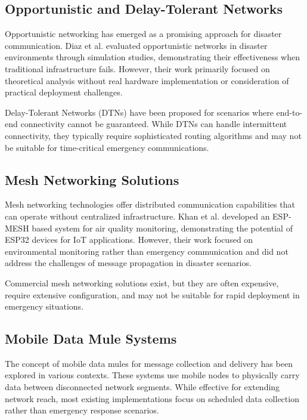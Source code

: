 \documentclass[conference]{IEEEtran}
\begin{document}
\subsection{Opportunistic and Delay-Tolerant Networks}

Opportunistic networking has emerged as a promising approach for disaster communication. Diaz et al. \cite{Diaz2012} evaluated opportunistic networks in disaster environments through simulation studies, demonstrating their effectiveness when traditional infrastructure fails. However, their work primarily focused on theoretical analysis without real hardware implementation or consideration of practical deployment challenges.

Delay-Tolerant Networks (DTNs) have been proposed for scenarios where end-to-end connectivity cannot be guaranteed. While DTNs can handle intermittent connectivity, they typically require sophisticated routing algorithms and may not be suitable for time-critical emergency communications.

\subsection{Mesh Networking Solutions}

Mesh networking technologies offer distributed communication capabilities that can operate without centralized infrastructure. Khan et al. \cite{Khan2022} developed an ESP-MESH based system for air quality monitoring, demonstrating the potential of ESP32 devices for IoT applications. However, their work focused on environmental monitoring rather than emergency communication and did not address the challenges of message propagation in disaster scenarios.

Commercial mesh networking solutions exist, but they are often expensive, require extensive configuration, and may not be suitable for rapid deployment in emergency situations.

\subsection{Mobile Data Mule Systems}

The concept of mobile data mules for message collection and delivery has been explored in various contexts. These systems use mobile nodes to physically carry data between disconnected network segments. While effective for extending network reach, most existing implementations focus on scheduled data collection rather than emergency response scenarios.
\end{document}

